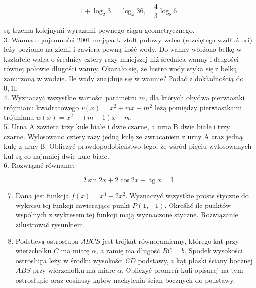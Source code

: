 \documentclass[10pt]{article}
\begin{document}
$$
1+\log _{2} 3, \quad \log _{x} 36, \quad \frac{4}{3} \log _{8} 6
$$

są trzema kolejnymi wyrazami pewnego ciągu geometrycznego.\\
3. Wanna o pojemności 2001 mająca kształt połowy walca (rozciętego wzdłuż osi) leży poziomo na ziemi i zawiera pewną ilość wody. Do wanny włożono belkę w kształcie walca o średnicy cztery razy mniejszej niż średnica wanny i długości równej połowie długości wanny. Okazało się, że lustro wody styka się z belką zanurzoną w wodzie. Ile wody znajduje się w wannie? Podać z dokładnością do $0,1 \mathrm{l}$.\\
4. Wyznaczyć wszystkie wartości parametru $m$, dla których obydwa pierwiastki trójmianu kwadratowego $v(x)=x^{2}+m x-m^{2}$ leżą pomiędzy pierwiastkami trójmianu $w(x)=x^{2}-(m-1) x-m$.\\
5. Urna A zawiera trzy kule białe i dwie czarne, a urna B dwie białe i trzy czarne. Wylosowano cztery razy jedną kulę ze zwracaniem z urny A oraz jedną kulę z urny B. Obliczyć prawdopodobieństwo tego, że wśród pięciu wylosowanych kul są co najmniej dwie kule białe.\\
6. Rozwiązać równanie:

$$
2 \sin 2 x+2 \cos 2 x+\operatorname{tg} x=3
$$

\begin{enumerate}
  \setcounter{enumi}{6}
  \item Dana jest funkcja $f(x)=x^{4}-2 x^{2}$. Wyznaczyć wszystkie proste styczne do wykresu tej funkcji zawierające punkt $P(1,-1)$. Określić ile punktów wspólnych z wykresem tej funkcji mają wyznaczone styczne. Rozwiązanie zilustrować rysunkiem.
  \item Podstawą ostrosłupa $A B C S$ jest trójkąt równoramienny, którego kąt przy wierzchołku $C$ ma miarę $\alpha$, a ramię ma długość $B C=b$. Spodek wysokości ostrosłupa leży w środku wysokości $\overline{C D}$ podstawy, a kąt płaski ściany bocznej $A B S$ przy wierzchołku ma miare $\alpha$. Obliczyć promień kuli opisanej na tym ostrosłupie oraz cosinusy kątów nachylenia ścian bocznych do podstawy.
\end{enumerate}
\end{document}
